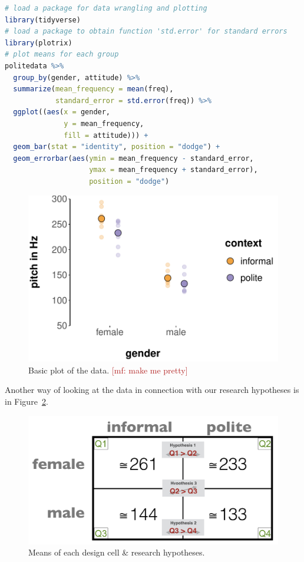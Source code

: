 \documentclass[nobib]{tufte-handout}
\renewcommand{\mf}[1]{\textcolor{firebrick}{[mf: #1]}}
\begin{document}
\begin{lstlisting}[language=R]
# load a package for data wrangling and plotting
library(tidyverse)
# load a package to obtain function 'std.error' for standard errors
library(plotrix)
# plot means for each group
politedata %>% 
  group_by(gender, attitude) %>% 
  summarize(mean_frequency = mean(freq),
            standard_error = std.error(freq)) %>% 
  ggplot((aes(x = gender, 
              y = mean_frequency, 
              fill = attitude))) + 
  geom_bar(stat = "identity", position = "dodge") +
  geom_errorbar(aes(ymin = mean_frequency - standard_error,
                    ymax = mean_frequency + standard_error), 
                    position = "dodge")
\end{lstlisting}


\begin{figure}[t]
  \centering
    \includegraphics[width = \textwidth]{pics/basic_data_plot.pdf}
    \caption{Basic plot of the data. \mf{make me pretty}}
     \label{fig:BasicPlotData_data}
\end{figure}

Another way of looking at the data in connection with our research hypotheses is in Figure~\ref{fig:BasicPlotData_table}.

\begin{figure}[h]
  \centering
    \includegraphics[width = \textwidth]{pics/table_mean_hypotheses.png}
    \caption{Means of each design cell \& research hypotheses.}
    \label{fig:BasicPlotData_table}
\end{figure}
\end{document}
